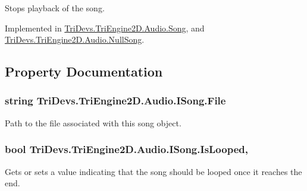 Stops playback of the song. 



Implemented in \hyperlink{class_tri_devs_1_1_tri_engine2_d_1_1_audio_1_1_song_a24edfbb8f48ece05a9f94b23843778a5}{Tri\-Devs.\-Tri\-Engine2\-D.\-Audio.\-Song}, and \hyperlink{class_tri_devs_1_1_tri_engine2_d_1_1_audio_1_1_null_song_aa5498f4a12aeeead219f9f4b6e08faaf}{Tri\-Devs.\-Tri\-Engine2\-D.\-Audio.\-Null\-Song}.



\subsection{Property Documentation}
\hypertarget{interface_tri_devs_1_1_tri_engine2_d_1_1_audio_1_1_i_song_a5610c3ab21ec36403c5a632a24a57c54}{
\subsubsection[{File}]{\setlength{\rightskip}{0pt plus 5cm}string Tri\-Devs.\-Tri\-Engine2\-D.\-Audio.\-I\-Song.\-File\hspace{0.3cm}{\ttfamily [get]}}}\label{interface_tri_devs_1_1_tri_engine2_d_1_1_audio_1_1_i_song_a5610c3ab21ec36403c5a632a24a57c54}


Path to the file associated with this song object. 

\hypertarget{interface_tri_devs_1_1_tri_engine2_d_1_1_audio_1_1_i_song_a6a5eeb5f1f6418fda045baeba034e734}{
\subsubsection[{Is\-Looped}]{\setlength{\rightskip}{0pt plus 5cm}bool Tri\-Devs.\-Tri\-Engine2\-D.\-Audio.\-I\-Song.\-Is\-Looped\hspace{0.3cm}{\ttfamily [get]}, {\ttfamily [set]}}}\label{interface_tri_devs_1_1_tri_engine2_d_1_1_audio_1_1_i_song_a6a5eeb5f1f6418fda045baeba034e734}


Gets or sets a value indicating that the song should be looped once it reaches the end. 


